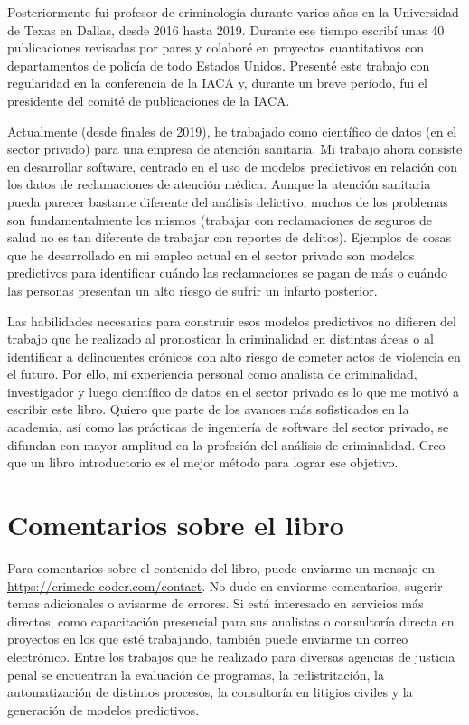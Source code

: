 \documentclass[
  letterpaper,
]{scrbook}
\begin{document}
Posteriormente fui profesor de criminología durante varios años en la
Universidad de Texas en Dallas, desde 2016 hasta 2019. Durante ese
tiempo escribí unas 40 publicaciones revisadas por pares y colaboré en
proyectos cuantitativos con departamentos de policía de todo Estados
Unidos. Presenté este trabajo con regularidad en la conferencia de la
IACA y, durante un breve período, fui el presidente del comité de
publicaciones de la IACA.

Actualmente (desde finales de 2019), he trabajado como científico de
datos (en el sector privado) para una empresa de atención sanitaria. Mi
trabajo ahora consiste en desarrollar software, centrado en el uso de
modelos predictivos en relación con los datos de reclamaciones de
atención médica. Aunque la atención sanitaria pueda parecer bastante
diferente del análisis delictivo, muchos de los problemas son
fundamentalmente los mismos (trabajar con reclamaciones de seguros de
salud no es tan diferente de trabajar con reportes de delitos). Ejemplos
de cosas que he desarrollado en mi empleo actual en el sector privado
son modelos predictivos para identificar cuándo las reclamaciones se
pagan de más o cuándo las personas presentan un alto riesgo de sufrir un
infarto posterior.

Las habilidades necesarias para construir esos modelos predictivos no
difieren del trabajo que he realizado al pronosticar la criminalidad en
distintas áreas o al identificar a delincuentes crónicos con alto riesgo
de cometer actos de violencia en el futuro. Por ello, mi experiencia
personal como analista de criminalidad, investigador y luego científico
de datos en el sector privado es lo que me motivó a escribir este libro.
Quiero que parte de los avances más sofisticados en la academia, así
como las prácticas de ingeniería de software del sector privado, se
difundan con mayor amplitud en la profesión del análisis de
criminalidad. Creo que un libro introductorio es el mejor método para
lograr ese objetivo.

\section*{Comentarios sobre el libro}\label{comentarios-sobre-el-libro}


Para comentarios sobre el contenido del libro, puede enviarme un mensaje
en \url{https://crimede-coder.com/contact}. No dude en enviarme
comentarios, sugerir temas adicionales o avisarme de errores. Si está
interesado en servicios más directos, como capacitación presencial para
sus analistas o consultoría directa en proyectos en los que esté
trabajando, también puede enviarme un correo electrónico. Entre los
trabajos que he realizado para diversas agencias de justicia penal se
encuentran la evaluación de programas, la redistritación, la
automatización de distintos procesos, la consultoría en litigios civiles
y la generación de modelos predictivos.
\end{document}
